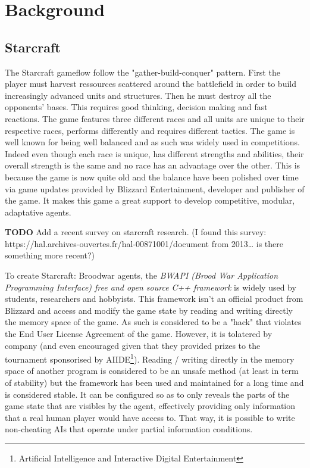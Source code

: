 \section{Background}\label{section:background}

\subsection{Starcraft}

The Starcraft gameflow follow the "gather-build-conquer" pattern. First the player must harvest ressources
scattered around the battlefield in order to build increasingly advanced units and structures.
Then he must destroy all the opponents' bases. This requires good thinking, decision making and fast reactions.
The game features three different races and all units are unique to their respective races,
performs differently and requires different tactics.
The game is well known for being well balanced and as such was widely used in competitions.
Indeed even though each race is unique, has different strengths and abilities, their overall strength
is the same and no race has an advantage over the other. This is because the game is now quite old
and the balance have been polished over time via game updates provided by Blizzard Entertainment,
developer and publisher of the game. It makes this game a great support to develop competitive, modular,
adaptative agents.

{\bf TODO} Add a recent survey on starcraft research.
(I found this survey: https://hal.archives-ouvertes.fr/hal-00871001/document from 2013… is there something more recent?)

\cite{OnSyUrRiChPr13}
\cite{CeCh17}

To create Starcraft: Broodwar agents, the \emph{BWAPI (Brood War
Application Programming Interface)
free and open source C++ framework} is widely used by students,
researchers and hobbyists. This framework isn't an
official product from Blizzard and access and modify the game state
by reading and writing directly the memory space of
the game. As such is considered to be a "hack" that violates the
End User License Agreement of the game. However, it
is tolatered by company (and even encouraged given that they provided
prizes to the tournament sponsorised by AIIDE\footnote{Artificial Intelligence
and Interactive Digital Entertainment}). Reading / writing directly
in the memory space of another program is
considered to be an unsafe method (at least in term of stability) but
the framework has been used and maintained for a long time and is considered stable.
It can be configured so as to only reveals the parts of
the game state that are visibles by the agent, effectively providing only information
that a real human player would have access to. That way, it is possible to write
non-cheating AIs that operate under partial information conditions.


